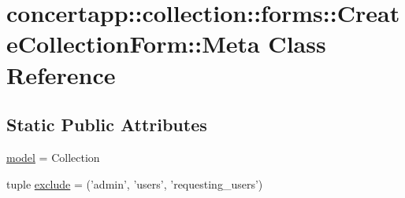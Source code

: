 \hypertarget{classconcertapp_1_1collection_1_1forms_1_1_create_collection_form_1_1_meta}{
\section{concertapp::collection::forms::CreateCollectionForm::Meta Class Reference}
\label{classconcertapp_1_1collection_1_1forms_1_1_create_collection_form_1_1_meta}
}
\subsection*{Static Public Attributes}
\begin{DoxyCompactItemize}
\item 
\hyperlink{classconcertapp_1_1collection_1_1forms_1_1_create_collection_form_1_1_meta_ab8e868cd1d80769e06795373e40c48b3}{model} = Collection
\item 
tuple \hyperlink{classconcertapp_1_1collection_1_1forms_1_1_create_collection_form_1_1_meta_ae1a934f14843620ff8cb9adf693e6df5}{exclude} = ('admin', 'users', 'requesting\_\-users')
\end{DoxyCompactItemize}


